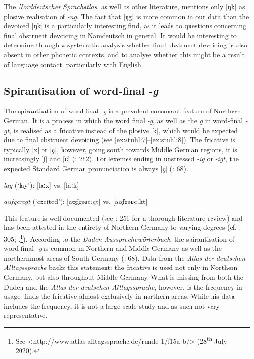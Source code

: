 \documentclass[output=paper]{langsci/langscibook}
\begin{document}
The \textit{Norddeutscher Sprachatlas}, as well as other literature, mentions only [ŋk] as plosive realisation of \textit{-ng}. The fact that [ŋg] is more common in our data than the devoiced [ŋk] is a particularly interesting find, as it leads to questions concerning final obstruent devoicing in Namdeutsch in general. It would be interesting to determine through a systematic analysis whether final obstruent devoicing is also absent in other phonetic contexts, and to analyse whether this might be a result of language contact, particularly with English. 

\subsection{Spirantisation of word-final \textit{-g}}
\label{sec:stuhl:4.4}

The spirantisation of word-final \textit{-g} is a prevalent consonant feature of Northern German. It is a process in which the word final \textit{-g}, as well as the \textit{g} in word-final \textit{-gt}, is realised as a fricative instead of the plosive [k], which would be expected due to final obstruent devoicing (see \ref{ex:stuhl:7}--\ref{ex:stuhl:8}). The fricative is typically [x] or [ç], however, going south towards Middle German regions, it is increasingly [ʃ] and [ɕ] (\citealt{elmentaler_norddeutscher_2015}: 252). For lexemes ending in unstressed \textit{-ig} or \textit{-igt}, the expected Standard German pronunciation is always [ç] (\citealt{kleiner_duden_2015}: 68). 

 
\ea
\label{ex:stuhl:7}   
\textit{lag} (‘lay’): {[laːx]} vs. {[laːk]}
 \z
 
 
\ea
\label{ex:stuhl:8} 
{\textit{aufgeregt}} (‘excited’): {[aʊ̯⁠fgəʁeːçt]} vs. {[aʊ̯⁠fgəʁeːkt]}
\z
 
 

This feature is well-documented (see \citealt{elmentaler_norddeutscher_2015}: 251 for a thorough literature review) and has been attested in the entirety of Northern Germany to varying degrees (cf. \citealt{konig_atlas_2019b}: 305; \citealt{elspas_atlas_2003}.\footnote{See <http://www.atlas-alltagssprache.de/runde-1/f15a-b/> (28\textsuperscript{th} July 2020).}). According to the \textit{Duden Aussprachewörterbuch}, the spirantisation of word-final \textit{-g} is common in Northern and Middle Germany as well as the northernmost areas of South Germany (\citealt{kleiner_duden_2015}: 68). Data from the \textit{Atlas der deutschen Alltagssprache} backs this statement: the fricative is used not only in Northern Germany, but also throughout Middle Germany. What is missing from both the Duden and the \textit{Atlas der deutschen Alltagssprache}, however, is the frequency in usage. \citet[303ff]{konig_atlas_2019b} finds the fricative almost exclusively in northern areas. While his data includes the frequency, it is not a large-scale study and as such not very representative. 
\end{document}
